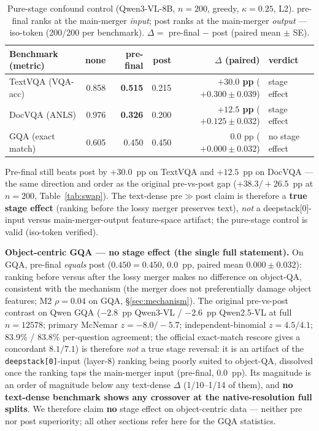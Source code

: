 \documentclass[sigconf,review,anonymous]{acmart}
\begin{document}
\begin{table}[t]
  \centering
  \small
  \caption{Pure-stage confound control (Qwen3-VL-8B, $n = 200$, greedy,
    $\kappa = 0.25$, L2). pre-final ranks at the main-merger \emph{input}; post
    ranks at the main-merger \emph{output} --- iso-token (200/200 per
    benchmark). $\Delta =$ pre-final $-$ post (paired mean $\pm$ SE).}
  \label{tab:prefinal}
  \begin{tabular}{@{}l r r r r l@{}}
    \toprule
    Benchmark (metric) & none & pre-final & post & $\Delta$ (paired) & verdict \\
    \midrule
    TextVQA (VQA-acc) & 0.858 & \textbf{0.515} & 0.215 & \textbf{$+30.0$ pp} ($+0.300{\pm}0.039$) & stage effect \\
    DocVQA (ANLS)     & 0.976 & \textbf{0.326} & 0.200 & \textbf{$+12.5$ pp} ($+0.125{\pm}0.032$) & stage effect \\
    GQA (exact match) & 0.605 & 0.450          & 0.450 & $0.0$ pp ($+0.000{\pm}0.032$)           & no stage effect \\
    \bottomrule
  \end{tabular}
\end{table}

Pre-final still beats post by $+30.0$~pp on TextVQA and $+12.5$~pp on DocVQA ---
the same direction and order as the original pre-vs-post gap
($+38.3 / +26.5$~pp at $n = 200$, Table~\ref{tab:swap}). The text-dense
pre$\gg$post claim is therefore a \textbf{true stage effect} (ranking before
the lossy merger preserves text), \emph{not} a deepstack[0]-input versus
main-merger-output feature-space artifact; the pure-stage control is valid
(iso-token verified).

\textbf{Object-centric GQA --- no stage effect (the single full statement).} On
GQA, pre-final \emph{equals} post ($0.450 = 0.450$, $0.0$~pp, paired mean
$0.000 \pm 0.032$): ranking before versus after the lossy merger makes no
difference on object-QA, consistent with the mechanism (the merger does not
preferentially damage object features; M2 $\rho = 0.04$ on GQA,
\S\ref{sec:mechanism}). The original pre-vs-post contrast on Qwen GQA
($-2.8$~pp Qwen3-VL / $-2.6$~pp Qwen2.5-VL at full $n = 12578$; primary
McNemar $z = -8.0 / -5.7$; independent-binomial $z = 4.5 / 4.1$; 83.9\% /
83.8\% per-question agreement; the official exact-match rescore gives a
concordant $8.1 / 7.1$) is therefore \emph{not} a true stage reversal: it is an
artifact of the \texttt{deepstack[0]}-input (layer-8) ranking being poorly
suited to object-QA, dissolved once the ranking taps the main-merger input
(pre-final, $0.0$~pp). Its magnitude is an order of magnitude below any
text-dense $\Delta$ (1/10--1/14 of them), and \textbf{no text-dense benchmark
shows any crossover at the native-resolution full splits}. We therefore claim
\textbf{no} stage effect on object-centric data --- neither pre nor post
superiority; all other sections refer here for the GQA statistics.
\end{document}
